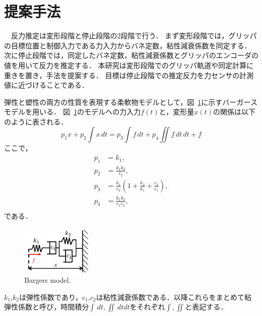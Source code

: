 \documentclass[a4paper]{jarticle}
\begin{document}
\section{提案手法}
　反力推定は変形段階と停止段階の2段階で行う．
まず変形段階では，グリッパの目標位置と制御入力である力入力からバネ定数，粘性減衰係数を同定する．
次に停止段階では，同定したバネ定数，粘性減衰係数とグリッパのエンコーダの値を用いて反力を推定する．
本研究は変形段階でのグリッパ軌道や同定計算に重きを置き，手法を提案する．
目標は停止段階での推定反力を力センサの計測値に近づけることである．

弾性と塑性の両方の性質を表現する柔軟物モデルとして，図~\ref{fig:BS_model}に示すバーガースモデルを用いる\cite{ref_MSD}．
図~\ref{fig:BS_model}の{\color{blue}モデルへの力入力}$f(t)$と，変形量$x(t)$の関係は以下のように表される．
\begin{equation}
    p_1 {x} + p_2 \int{x}\,dt = p_3\int{f}\,dt +p_4\iint{f}\,dt\,dt  + f
    \label{eq:BSmodel}
\end{equation}
ここで，
\begin{equation}
    \begin{aligned}
        p_1 &= k_1,  \\
        p_2 &= \frac{k_1 k_2}{c_2},    \\
        p_3 &= \frac{k_1}{c_2}\left(1+\frac{k_2}{k_1}+\frac{c_2}{c_1}\right),\\
        p_4 &= \frac{k_1k_2}{c_1 c_2} ,\\
    \end{aligned}
    \label{eq:p2ck}
\end{equation}
である．
\begin{figure}[tb]
    \centering
    \includegraphics[width=0.3\textwidth]{BS_model.pdf}
    \caption{Bargers model.}
    \label{fig:BS_model}
\end{figure}
$k_1$,$k_2$は弾性係数であり，$c_1$,$c_2$は粘性減衰係数である．以降これらをまとめて粘弾性係数と呼び，時間積分$\int \,dt, \iint \,dtdt $をそれぞれ$\int, \iint$と表記する．
\end{document}
